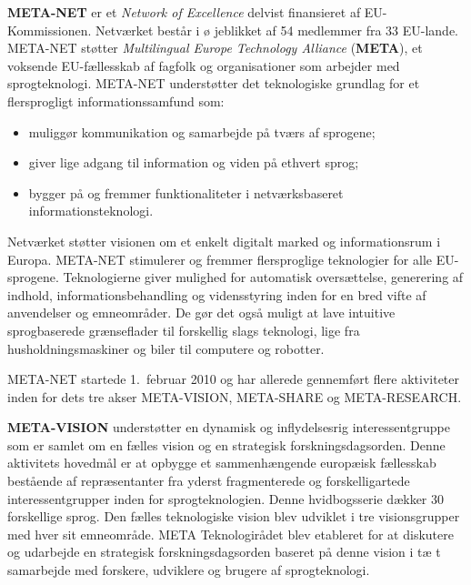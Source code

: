 \begin{multicols}{2}

  \textbf{META-NET} er et {\it Network of Excellence} delvist
  finansieret af EU-Kommissionen. Netv\ae rket best\aa r i \o
  jeblikket af 54 medlemmer fra 33 EU-lande. META-NET st\o tter {\it
    Multilingual Europe Technology Alliance} (\textbf{META}), et
  voksende EU-f\ae llesskab af fagfolk og organisationer som arbejder
  med sprogteknologi.  META-NET underst\o tter det teknologiske
  grundlag for et flersprogligt informationssamfund som:
  \begin{itemize}
  \item muligg\o r kommunikation og samarbejde \mbox{p\aa} tv\ae rs af
    sprogene;
 \item giver lige adgang til information og viden \mbox{p\aa} ethvert sprog;
 \item bygger \mbox{p\aa} og fremmer funktionaliteter i netv\ae rksbaseret
   informationsteknologi.
\end{itemize}

Netv\ae rket st\o tter visionen om et enkelt digitalt marked og
informationsrum i Europa. META-NET stimulerer og fremmer flersproglige
teknologier for alle EU-sprogene. Teknologierne giver mulighed for
automatisk overs\ae ttelse, generering af indhold,
informationsbehandling og vidensstyring inden for en bred vifte af
anvendelser og emneomr\aa der. De g\o r det \mbox{ogs\aa} muligt at
lave intuitive sprogbaserede gr\ae nseflader til forskellig slags
teknologi, lige fra husholdningsmaskiner og biler til computere og
robotter.

META-NET startede 1.\ februar 2010 og har allerede gennemf\o rt flere
aktiviteter inden for dets tre akser META-VISION, META-SHARE og
META-RESEARCH.

\textbf{META-VISION} underst\o tter en dynamisk og inflydelsesrig
interessentgruppe som er samlet om en f\ae lles vision og en
strategisk forskningsdagsorden. Denne aktivitets hovedm\aa l er at
opbygge et sammenh\ae ngende europ\ae isk f\ae llesskab best\aa ende
af repr\ae sentanter fra yderst fragmenterede og forskelligartede
interessentgrupper inden for sprogteknologien. Denne hvidbogsserie
d\ae kker 30 forskellige sprog. Den f\ae lles teknologiske vision blev
udviklet i tre visionsgrupper med hver sit emneomr\aa de. META
Teknologir\aa det blev etableret for at diskutere og udarbejde en
strategisk forskningsdagsorden baseret \mbox{p\aa} denne vision i t\ae
t samarbejde med forskere, udviklere og brugere af sprogteknologi.



\end{multicols}
